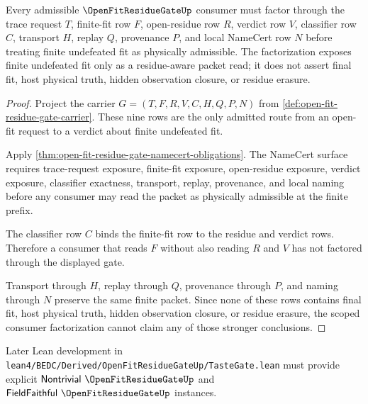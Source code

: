 \begin{theorem}
\label{thm:open-fit-residue-gate-scoped-consumer-factorization}
Every admissible $\OpenFitResidueGateUp$ consumer must factor through the trace request $T$, finite-fit row $F$, open-residue row $R$, verdict row $V$, classifier row $C$, transport $H$, replay $Q$, provenance $P$, and local NameCert row $N$ before treating finite undefeated fit as physically admissible. The factorization exposes finite undefeated fit only as a residue-aware packet read; it does not assert final fit, host physical truth, hidden observation closure, or residue erasure.
\end{theorem}
\begin{proof}
Project the carrier $G=(T,F,R,V,C,H,Q,P,N)$ from \autoref{def:open-fit-residue-gate-carrier}. These nine rows are the only admitted route from an open-fit request to a verdict about finite undefeated fit.

Apply \autoref{thm:open-fit-residue-gate-namecert-obligations}. The NameCert surface requires trace-request exposure, finite-fit exposure, open-residue exposure, verdict exposure, classifier exactness, transport, replay, provenance, and local naming before any consumer may read the packet as physically admissible at the finite prefix.

The classifier row $C$ binds the finite-fit row to the residue and verdict rows. Therefore a consumer that reads $F$ without also reading $R$ and $V$ has not factored through the displayed gate.

Transport through $H$, replay through $Q$, provenance through $P$, and naming through $N$ preserve the same finite packet. Since none of these rows contains final fit, host physical truth, hidden observation closure, or residue erasure, the scoped consumer factorization cannot claim any of those stronger conclusions.
\end{proof}



Later Lean development in \texttt{lean4/BEDC/Derived/OpenFitResidueGateUp/TasteGate.lean} must provide explicit $\mathsf{Nontrivial}\ \OpenFitResidueGateUp$ and $\mathsf{FieldFaithful}\ \OpenFitResidueGateUp$ instances.

